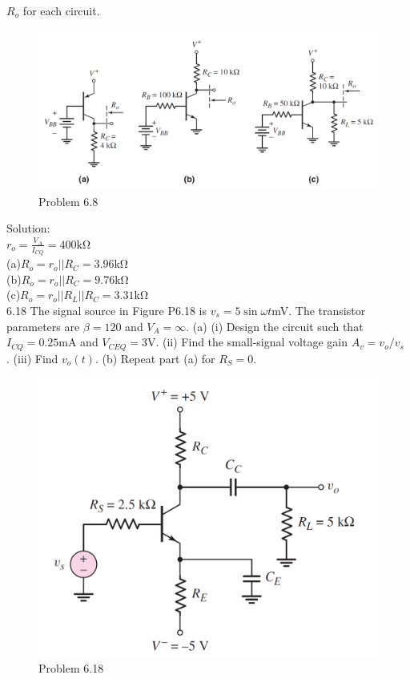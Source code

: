 \documentclass[a4paper,11pt,UTF8]{article}
\begin{document}
$R_o$ for each circuit.
\begin{figure}[H] 
	\centering 
	\includegraphics[scale=0.20]{MD6.8.png}
	\caption{Problem 6.8}
\end{figure}
\noindent Solution:\\
$r_o=\frac{V_A}{I_{CQ}}=400\mathrm{k\Omega}$\\
(a)$R_o=r_o||R_C=3.96\mathrm{k\Omega}$\\
(b)$R_o=r_o||R_C=9.76\mathrm{k\Omega}$\\
(c)$R_o=r_o||R_L||R_C=3.31\mathrm{k\Omega}$\\
6.18 The signal source in Figure P6.18 is $v_s = 5 \sin\omega t $mV. The transistor parameters
are $\beta = 120$ and $V_A =\infty$. (a) (i) Design the circuit such that
$I_{CQ} = 0.25 $mA and $V_{CEQ} = 3 $V. (ii) Find the small-signal voltage gain
$A_v = v_o/v_s$ . (iii) Find $v_o(t)$. (b) Repeat part (a) for $R_S = 0$.
\begin{figure}[H] 
	\centering 
	\includegraphics[scale=0.20]{MD6.18.png}
	\caption{Problem 6.18}
\end{figure}
\end{document}
